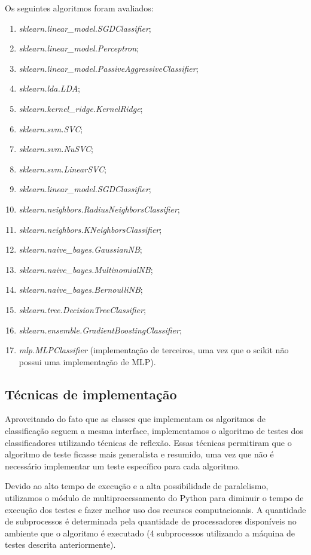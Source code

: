\documentclass[11pt]{article}
\begin{document}
Os seguintes algoritmos foram avaliados:

\begin{enumerate}
    \item \textit{sklearn.linear\_model.SGDClassifier};
    \item \textit{sklearn.linear\_model.Perceptron};
    \item \textit{sklearn.linear\_model.PassiveAggressiveClassifier};
    \item \textit{sklearn.lda.LDA};
    \item \textit{sklearn.kernel\_ridge.KernelRidge};
    \item \textit{sklearn.svm.SVC};
    \item \textit{sklearn.svm.NuSVC};
    \item \textit{sklearn.svm.LinearSVC};
    \item \textit{sklearn.linear\_model.SGDClassifier};
    \item \textit{sklearn.neighbors.RadiusNeighborsClassifier};
    \item \textit{sklearn.neighbors.KNeighborsClassifier};
    \item \textit{sklearn.naive\_bayes.GaussianNB};
    \item \textit{sklearn.naive\_bayes.MultinomialNB};
    \item \textit{sklearn.naive\_bayes.BernoulliNB};
    \item \textit{sklearn.tree.DecisionTreeClassifier};
    \item \textit{sklearn.ensemble.GradientBoostingClassifier};
    \item \textit{mlp.MLPClassifier} (implementação de terceiros, uma vez que o scikit não possui uma implementação de MLP).
\end{enumerate}

\subsection{Técnicas de implementação}

Aproveitando do fato que as classes que implementam os algoritmos de
classificação seguem a mesma interface, implementamos o algoritmo de testes dos
classificadores utilizando técnicas de reflexão. Essas técnicas permitiram que o
algoritmo de teste ficasse mais generalista e resumido, uma vez que não é
necessário implementar um teste específico para cada algoritmo.

Devido ao alto tempo de execução e a alta possibilidade de paralelismo,
utilizamos o módulo de multiprocessamento do Python para diminuir o tempo de
execução dos testes e fazer melhor uso dos recursos computacionais. A
quantidade de subprocessos é determinada pela quantidade de processadores
disponíveis no ambiente que o algoritmo é executado (4 subprocessos utilizando
a máquina de testes descrita anteriormente).
\end{document}

